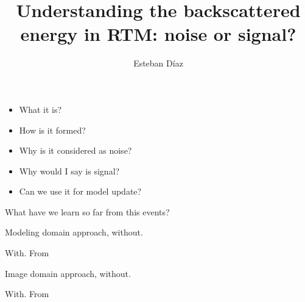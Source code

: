 




\title[]{Understanding the backscattered energy in RTM: noise or signal?}
\subtitle{}
\author[]{Esteban  D\'{i}az}
\date{}
\logo{}

\def\big#1{\begin{center} \LARGE \textbf{#1} \end{center}}
\def\cen#1{\begin{center}        \textbf{#1} \end{center}}

 { \cwpcover }



\begin{frame}
	\begin{itemize}
		\item What it is?  
		\item How is it formed?
		\item Why is it considered as noise?
		\item Why would I say is signal? 
		\item Can we use it for model update?
	\end{itemize}
\end{frame}




\begin{frame}
   What have we learn so far from this events?
\end{frame}

\begin{frame}
Modeling domain approach, without.
\end{frame}

\begin{frame}
With. From ~\cite{fletcher:2049}
\end{frame}

\begin{frame}
Image domain approach, without.
\end{frame}

\begin{frame}
With. From ~\cite{guitton:S19}
\end{frame}


